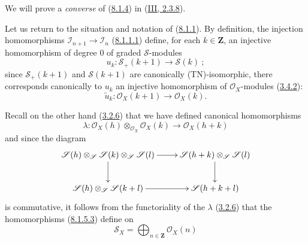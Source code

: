 We will prove a \emph{converse} of
(\hyperref[II.8.1.4]{8.1.4}) in
(\hyperref[III.2.3.8]{III, 2.3.8}).

\begin{env}[8.1.5]
\label{II.8.1.5}
Let us return to the situation and notation of
(\hyperref[II.8.1.1]{8.1.1}). By definition, the injection homomorphisms
$\mathcal{I}_{n+1}\to\mathcal{I}_n$
(\hyperref[II.8.1.1.1]{8.1.1.1}) define, for each $k\in\mathbf{Z}$, an
injective homomorphism of degree $0$ of graded $\mathcal{S}$-modules
\begin{equation}
\label{II.8.1.5.1}
  u_k:\mathcal{S}_+(k+1)\to\mathcal{S}(k)~;
\tag{8.1.5.1}
\end{equation}
since $\mathcal{S}_+(k+1)$ and $\mathcal{S}(k+1)$ are canonically
(TN)-isomorphic, there corresponds canonically to $u_k$ an injective homomorphism
of $\mathcal{O}_X$-modules (\hyperref[II.3.4.2]{3.4.2}):
\begin{equation}
\label{II.8.1.5.2}
  \widetilde{u}_k:\mathcal{O}_X(k+1)\to\mathcal{O}_X(k).
\tag{8.1.5.2}
\end{equation}

Recall on the other hand (\hyperref[II.3.2.6]{3.2.6}) that we have defined
canonical homomorphisms
\begin{equation}
\label{II.8.1.5.3}
  \lambda:\mathcal{O}_X(h)\otimes_{\mathcal{O}_X}\mathcal{O}_X(k)
  \to\mathcal{O}_X(h+k)
\tag{8.1.5.3}
\end{equation}
and since the diagram
\[
\xymatrix{
  \mathcal{S}(h)\otimes_{\mathcal{S}}\mathcal{S}(k)
    \otimes_{\mathcal{S}}\mathcal{S}(l)\ar[r]\ar[d]
  & \mathcal{S}(h+k)\otimes_{\mathcal{S}}\mathcal{S}(l)\ar[d]\\
  \mathcal{S}(h)\otimes_{\mathcal{S}}\mathcal{S}(k+l)\ar[r]
  & \mathcal{S}(h+k+l)
}
\]
is commutative, it follows from the functoriality of the $\lambda$
(\hyperref[II.3.2.6]{3.2.6}) that the homomorphisms
(\hyperref[II.8.1.5.3]{8.1.5.3}) define on
\begin{equation}
\label{II.8.1.5.4}
  \mathcal{S}_X=\bigoplus_{n\in\mathbf{Z}}\mathcal{O}_X(n)
\tag{8.1.5.4}
\end{equation}


\end{env}
